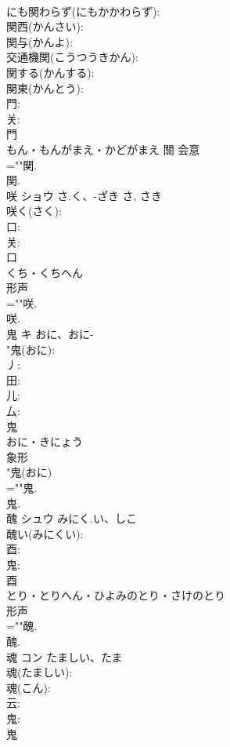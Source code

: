 \documentclass[8pt]{extreport}
\begin{document}
\begin{CJK}{UTF8}{min}
\\	にも関わらず(にもかかわらず): 
\\	関西(かんさい): 
\\	関与(かんよ): 
\\	交通機関(こうつうきかん): 
\\	関する(かんする): 
\\	関東(かんとう): 
\\	門: 
\\	关: 
\\	門	
\\	もん・もんがまえ・かどがまえ	關	会意 
\\	=""関.
\\	関.
\\	咲	ショウ	さ.く、-ざき	さ, さき	
\\	咲く(さく): 
\\	口: 
\\	关: 
\\	口	
\\	くち・くちへん	
\\	形声 
\\	=""咲.
\\	咲.
\\	鬼	キ	おに、おに-		
\\	"鬼(おに): 
\\	丿: 
\\	田: 
\\	儿: 
\\	厶: 
\\	鬼	
\\	おに・きにょう	
\\	象形 
\\	"鬼(おに) 
\\	=""鬼.
\\	鬼.
\\	醜	シュウ	みにく.い、しこ		
\\	醜い(みにくい): 
\\	酉: 
\\	鬼: 
\\	酉	
\\	とり・とりへん・ひよみのとり・さけのとり	
\\	形声 
\\	=""醜.
\\	醜.
\\	魂	コン	たましい、たま		
\\	魂(たましい): 
\\	魂(こん): 
\\	云: 
\\	鬼: 
\\	鬼	

\end{CJK}
\end{document}
